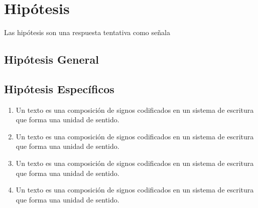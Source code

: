 	\chapter{Hipótesis}\label{Cap: Hipótesis}
		Las hipótesis son una respuesta tentativa 
		como señala \cite{Das-2019} \lipsum[14]
			\section{Hipótesis General}\label{Sec: Hipótesis General}
				\lipsum[15]	
			\section{Hipótesis Específicos}\label{Sec: Hipótesis Específicos}
				\begin{enumerate}
					\item Un texto es una composición de signos codificados en un sistema
					de escritura que forma una unidad de sentido.
					\item Un texto es una composición de signos codificados en un sistema
					de escritura que forma una unidad de sentido.
					\item Un texto es una composición de signos codificados en un sistema
					de escritura que forma una unidad de sentido.
					\item Un texto es una composición de signos codificados en un sistema
					de escritura que forma una unidad de sentido.
				\end{enumerate}
		
		